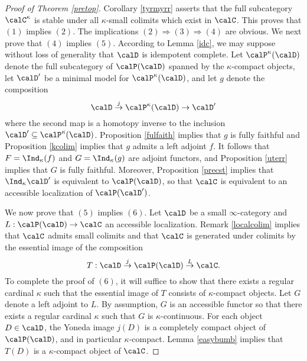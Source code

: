 \begin{proof}[Proof of Theorem \ref{pretop}]
Corollary \ref{tyrmyrr} asserts that the full subcategory $\calC^{\kappa}$ is stable under all
$\kappa$-small colimits which exist in $\calC$. This proves that $(1)$ implies $(2)$.
The implications $(2) \Rightarrow (3) \Rightarrow (4)$ are obvious. We next prove that $(4)$ implies
$(5)$. According to Lemma \ref{idc}, we may suppose without loss of generality that $\calD$ is idempotent complete. Let
$\calP^{\kappa}(\calD)$ denote the full subcategory of $\calP(\calD)$ spanned by the $\kappa$-compact objects, let $\calD'$ be a minimal model for $\calP^{\kappa}(\calD)$, and let $g$ denote the composition
$$ \calD \stackrel{j}{\rightarrow} \calP^{\kappa}(\calD) \rightarrow \calD'$$
where the second map is a homotopy inverse to the inclusion $\calD' \subseteq \calP^{\kappa}(\calD)$. Proposition \ref{fulfaith} implies that $g$ is fully faithful and Proposition \ref{kcolim} implies that $g$ admits a left adjoint $f$. It follows that $F = \Ind_{\kappa}(f)$ and $G = \Ind_{\kappa}(g)$ are adjoint functors, and Proposition \ref{uterr} implies that $G$ is fully faithful. Moreover,
Proposition \ref{precst} implies that $\Ind_{\kappa} \calD'$ is equivalent to $\calP(\calD)$,
so that $\calC$ is equivalent to an accessible localization of $\calP(\calD')$.

We now prove that $(5)$ implies $(6)$. Let $\calD$ be a small $\infty$-category and
$L: \calP(\calD) \rightarrow \calC$ an accessible localization. Remark \ref{localcolim} implies
that $\calC$ admits small colimits and that $\calC$ is generated under colimits by
the essential image of the composition
$$ T: \calD \stackrel{j}{\rightarrow} \calP(\calD) \stackrel{L}{\rightarrow} \calC.$$
To complete the proof of $(6)$, it will suffice to show that there exists a regular cardinal $\kappa$ such that the essential image of $T$ consists of $\kappa$-compact objects.
Let $G$ denote a left adjoint to $L$. By assumption, $G$ is an accessible functor so that there exists a regular cardinal $\kappa$ such that $G$ is $\kappa$-continuous. For each
object $D \in \calD$, the Yoneda image $j(D)$ is a completely compact object of
$\calP(\calD)$, and in particular $\kappa$-compact. Lemma \ref{easybumb} implies that
$T(D)$ is a $\kappa$-compact object of $\calC$. 


\end{proof}
